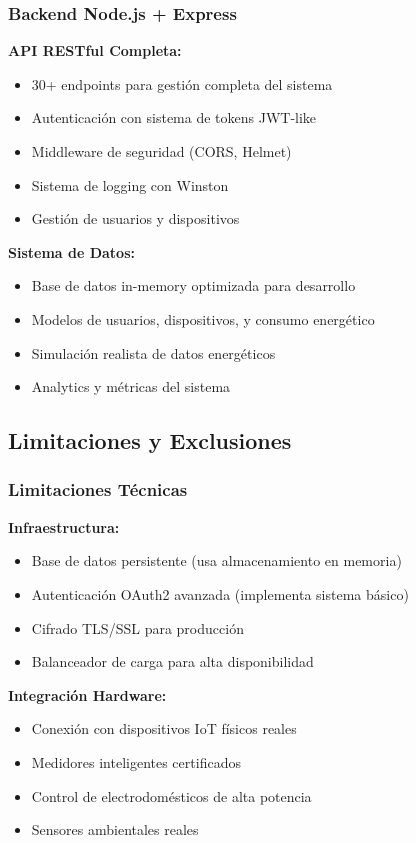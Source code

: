 \documentclass[12pt,a4paper,spanish]{article}
\begin{document}
\subsubsection{Backend Node.js + Express}

\textbf{API RESTful Completa:}
\begin{itemize}
    \item 30+ endpoints para gestión completa del sistema
    \item Autenticación con sistema de tokens JWT-like
    \item Middleware de seguridad (CORS, Helmet)
    \item Sistema de logging con Winston
    \item Gestión de usuarios y dispositivos
\end{itemize}

\textbf{Sistema de Datos:}
\begin{itemize}
    \item Base de datos in-memory optimizada para desarrollo
    \item Modelos de usuarios, dispositivos, y consumo energético
    \item Simulación realista de datos energéticos
    \item Analytics y métricas del sistema
\end{itemize}

\subsection{Limitaciones y Exclusiones}

\subsubsection{Limitaciones Técnicas}

\textbf{Infraestructura:}
\begin{itemize}
    \item Base de datos persistente (usa almacenamiento en memoria)
    \item Autenticación OAuth2 avanzada (implementa sistema básico)
    \item Cifrado TLS/SSL para producción
    \item Balanceador de carga para alta disponibilidad
\end{itemize}

\textbf{Integración Hardware:}
\begin{itemize}
    \item Conexión con dispositivos IoT físicos reales
    \item Medidores inteligentes certificados
    \item Control de electrodomésticos de alta potencia
    \item Sensores ambientales reales
\end{itemize}
\end{document}
